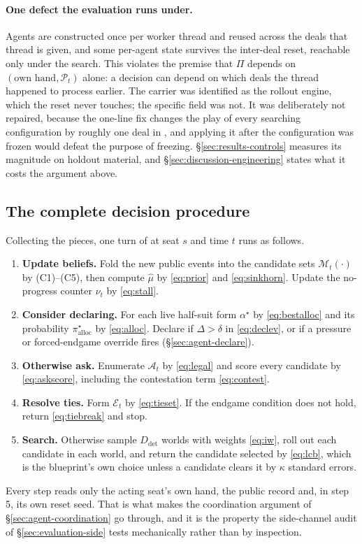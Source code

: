 \paragraph{One defect the evaluation runs under.} Agents are constructed once per worker thread and
reused across the deals that thread is given, and some per-agent state survives the inter-deal reset,
reachable only under the search. This violates the premise that $\Pi$ depends on
$(\text{own hand}, \mathcal{P}_t)$ alone: a decision can depend on which deals the thread happened to
process earlier. The carrier was identified as the rollout engine, which the reset never touches; the
specific field was not. It was deliberately not repaired, because the one-line fix changes the play of
every searching configuration by roughly one deal in \vsevenSsixIncidence{}, and applying it after the
configuration was frozen would defeat the purpose of freezing.
\S\ref{sec:results-controls} measures its magnitude on holdout material, and
\S\ref{sec:discussion-engineering} states what it costs the argument above.

\subsection{The complete decision procedure}
\label{sec:agent-full}

Collecting the pieces, one turn of \sestina{} at seat $s$ and time $t$ runs as follows.

\begin{enumerate}
\item \textbf{Update beliefs.} Fold the new public events into the candidate sets
  $\mathcal{M}_t(\cdot)$ by (C1)--(C5), then compute $\hat\mu$ by \eqref{eq:prior} and
  \eqref{eq:sinkhorn}. Update the no-progress counter $\nu_t$ by \eqref{eq:stall}.
\item \textbf{Consider declaring.} For each live half-suit form $\alpha^\star$ by
  \eqref{eq:bestalloc} and its probability $\pi_{\mathrm{alloc}}^\star$ by \eqref{eq:alloc}. Declare
  if $\Delta > \delta$ in \eqref{eq:declev}, or if a pressure or forced-endgame override fires
  (\S\ref{sec:agent-declare}).
\item \textbf{Otherwise ask.} Enumerate $\mathcal{A}_t$ by \eqref{eq:legal} and score every candidate
  by \eqref{eq:askscore}, including the contestation term \eqref{eq:contest}.
\item \textbf{Resolve ties.} Form $\mathcal{E}_t$ by \eqref{eq:tieset}. If the endgame condition does
  not hold, return \eqref{eq:tiebreak} and stop.
\item \textbf{Search.} Otherwise sample $D_{\mathrm{det}}$ worlds with weights \eqref{eq:iw}, roll out
  each candidate in each world, and return the candidate selected by \eqref{eq:lcb}, which is the
  blueprint's own choice unless a candidate clears it by $\kappa$ standard errors.
\end{enumerate}

Every step reads only the acting seat's own hand, the public record and, in step 5, its own reset
seed. That is what makes the coordination argument of \S\ref{sec:agent-coordination} go through, and it is the property the
side-channel audit of \S\ref{sec:evaluation-side} tests mechanically rather than by inspection.

